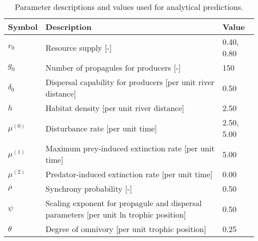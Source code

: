 \begin{table}[ht]
\centering
\caption{Parameter descriptions and values used for analytical predictions.} 
\label{tab:parms}
\begingroup\small
\begin{tabularx}{\textwidth}{lll}
  \hline
Symbol & Description & Value \\ 
  \hline
$r_0$ & Resource supply [-] & 0.40, 0.80 \\ 
  $g_0$ & Number of propagules for producers [-] & 150 \\ 
  $\delta_0$ & Dispersal capability for producers [per unit river distance] & 0.50 \\ 
  $h$ & Habitat density [per unit river distance] & 2.50 \\ 
  $\mu^{(0)}$ & Disturbance rate [per unit time] & 2.50, 5.00 \\ 
  $\mu^{(1)}$ & Maximum prey-induced extinction rate [per unit time] & 5.00 \\ 
  $\mu^{(2)}$ & Predator-induced extinction rate [per unit time] & 0.00 \\ 
  $\rho$ & Synchrony probability [-] & 0.50 \\ 
  $\psi$ & Scaling exponent for propagule and dispersal parameters [per unit ln trophic position] & 0.50 \\ 
  $\theta$ & Degree of omnivory [per unit trophic position] & 0.25 \\ 
   \hline
\end{tabularx}
\endgroup
\end{table}
